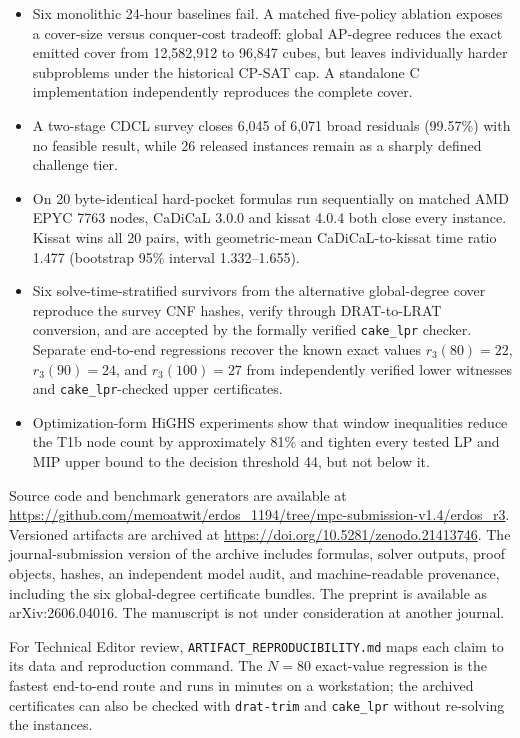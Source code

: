 \documentclass[10pt]{article}
\begin{document}
\begin{itemize}
\item Six monolithic 24-hour baselines fail. A matched five-policy ablation
  exposes a cover-size versus conquer-cost tradeoff: global AP-degree reduces
  the exact emitted cover from 12,582,912 to 96,847 cubes, but leaves
  individually harder subproblems under the historical CP-SAT cap. A
  standalone C implementation independently reproduces the complete cover.
\item A two-stage CDCL survey closes 6,045 of 6,071 broad residuals (99.57\%)
  with no feasible result, while 26 released instances remain as a sharply
  defined challenge tier.
\item On 20 byte-identical hard-pocket formulas run sequentially on matched
  AMD EPYC 7763 nodes, CaDiCaL 3.0.0 and kissat 4.0.4 both close every
  instance. Kissat wins all 20 pairs, with geometric-mean CaDiCaL-to-kissat
  time ratio 1.477 (bootstrap 95\% interval 1.332--1.655).
\item Six solve-time-stratified survivors from the alternative global-degree
  cover reproduce the survey CNF hashes, verify through DRAT-to-LRAT
  conversion, and are accepted by the formally verified \texttt{cake\_lpr}
  checker. Separate end-to-end regressions recover the known exact values
  $r_3(80)=22$, $r_3(90)=24$, and $r_3(100)=27$ from independently verified
  lower witnesses and \texttt{cake\_lpr}-checked upper certificates.
\item Optimization-form HiGHS experiments show that window inequalities
  reduce the T1b node count by approximately 81\% and tighten every tested LP
  and MIP upper bound to the decision threshold 44, but not below it.
\end{itemize}

Source code and benchmark generators are available at
\url{https://github.com/memoatwit/erdos_1194/tree/mpc-submission-v1.4/erdos_r3}.
Versioned artifacts are archived at
\url{https://doi.org/10.5281/zenodo.21413746}. The
journal-submission version of the archive includes formulas, solver outputs,
proof objects, hashes, an independent model audit, and machine-readable
provenance, including the six global-degree certificate bundles. The preprint
is available as arXiv:2606.04016. The manuscript is not under consideration at
another journal.

For Technical Editor review, \texttt{ARTIFACT\_REPRODUCIBILITY.md} maps each
claim to its data and reproduction command. The $N=80$ exact-value regression
is the fastest end-to-end route and runs in minutes on a workstation; the
archived certificates can also be checked with \texttt{drat-trim} and
\texttt{cake\_lpr} without re-solving the instances.
\end{document}
